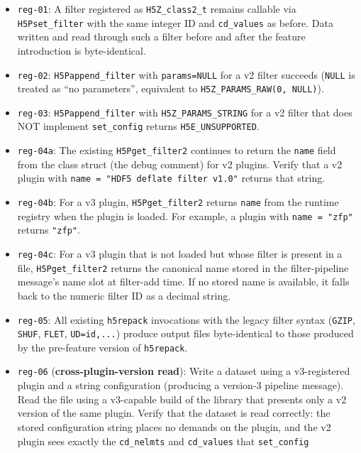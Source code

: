 \documentclass[../RFC-HDFG-2026-001.tex]{subfiles}
\begin{document}
\begin{itemize}
\item \texttt{reg-01}: A filter registered as \texttt{H5Z\_class2\_t} remains callable via
  \texttt{H5Pset\_filter} with the same integer ID and \texttt{cd\_values} as before.
  Data written and read through such a filter before and after the feature
  introduction is byte-identical.
\item \texttt{reg-02}: \texttt{H5Pappend\_filter} with \texttt{params=NULL} for a v2 filter
  succeeds (\texttt{NULL} is treated as ``no parameters'', equivalent to
  \texttt{H5Z\_PARAMS\_RAW(0, NULL)}).
\item \texttt{reg-03}: \texttt{H5Pappend\_filter} with \texttt{H5Z\_PARAMS\_STRING} for a
  v2 filter that does NOT implement \texttt{set\_config} returns \texttt{H5E\_UNSUPPORTED}.
\item \texttt{reg-04a}: The existing \texttt{H5Pget\_filter2} continues to return the
  \texttt{name} field from the class struct (the debug comment) for v2 plugins.
  Verify that a v2 plugin with \texttt{name = "HDF5 deflate filter v1.0"} returns
  that string.
\item \texttt{reg-04b}: For a v3 plugin, \texttt{H5Pget\_filter2}
  returns \texttt{name} from the runtime registry when the plugin is
  loaded.  For example, a plugin with \texttt{name = "zfp"} returns
  \texttt{"zfp"}.
\item \texttt{reg-04c}: For a v3 plugin that is not loaded but whose
  filter is present in a file, \texttt{H5Pget\_filter2} returns the
  canonical name stored in the filter-pipeline message's name slot at
  filter-add time.  If no stored name is available, it falls back to
  the numeric filter ID as a decimal string.
\item \texttt{reg-05}: All existing \texttt{h5repack} invocations with the legacy filter
  syntax (\texttt{GZIP}, \texttt{SHUF}, \texttt{FLET}, \texttt{UD=id,...}) produce
  output files byte-identical to those produced by the pre-feature version of
  \texttt{h5repack}.
\item \texttt{reg-06} (\textbf{cross-plugin-version read}): Write a dataset
  using a v3-registered plugin and a string configuration (producing a
  version-3 pipeline message).  Read the file using a v3-capable build of
  the library that presents only a v2 version of the same plugin.  Verify
  that the dataset is read correctly: the stored configuration string
  places no demands on the plugin, and the v2 plugin sees exactly the
  \texttt{cd\_nelmts} and \texttt{cd\_values} that \texttt{set\_config}

\end{itemize}
\end{document}
